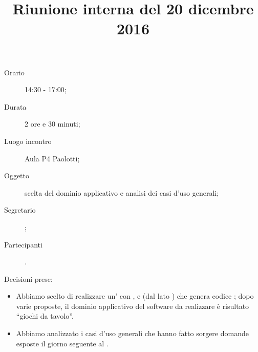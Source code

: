 


\author{\PB}
\supervisor{\MM}
\title{Riunione interna del 20 dicembre 2016}



\maketitle

\begin{description}
	\item[Orario] 14:30 - 17:00;
	\item[Durata] 2 ore e 30 minuti;
	\item[Luogo incontro] Aula P4 Paolotti;
	\item[Oggetto] scelta del dominio applicativo e analisi dei casi d'uso generali;
	\item[Segretario] \PB; 
	\item[Partecipanti] \ALL.
\end{description}

Decisioni prese:
\begin{itemize}
	\item Abbiamo scelto di realizzare un' con ,  e  (dal lato ) che genera codice ; dopo varie proposte, il dominio applicativo del software da realizzare è risultato “giochi da tavolo”.
	\item Abbiamo analizzato i casi d'uso generali che hanno fatto sorgere domande esposte il giorno seguente al \GP.
\end{itemize}

